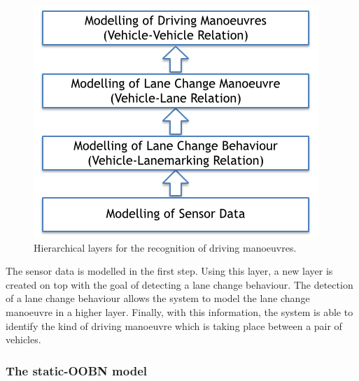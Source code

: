 \begin{figure}
\begin{center}
\includegraphics[scale=0.58]{./figures/DaimlerHierarchicalModelling}
\caption{\label{Figure:DaimlerHierarchicalModelling} Hierarchical layers for the recognition of driving manoeuvres.}
\end{center}
\end{figure}

The sensor data is modelled in the first step. Using this layer, a new layer is created on top with the goal of detecting a lane change behaviour. The detection of a lane change behaviour allows the system to model the lane change manoeuvre in a higher layer. Finally, with this information, the system is able to identify the kind of driving manoeuvre which is taking place between a pair of vehicles. 



\subsubsection{The static-OOBN model}

